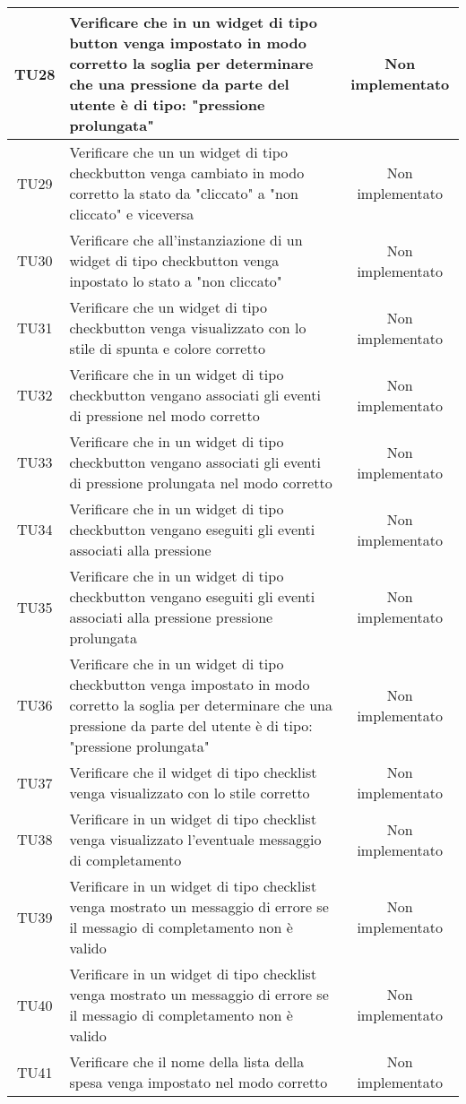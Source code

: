 \begin{center}
\begin{longtable}{|c|>{\centering}m{7cm}|c|}
		TU28 & Verificare che in un widget di tipo button venga impostato in modo corretto la soglia per determinare che una pressione da parte del utente è di tipo: "pressione prolungata" & Non implementato \\ \hline
		TU29 & Verificare che un un widget di tipo checkbutton venga cambiato in modo corretto la stato da "cliccato" a "non cliccato" e viceversa & Non implementato \\ \hline
		TU30 & Verificare che all'instanziazione di un widget di tipo checkbutton venga inpostato lo stato a "non cliccato" & Non implementato \\ \hline
		TU31 & Verificare che un widget di tipo checkbutton venga visualizzato con lo stile di spunta e colore corretto & Non implementato \\ \hline
		TU32 & Verificare che in un widget di tipo checkbutton vengano associati gli eventi di pressione nel modo corretto & Non implementato \\ \hline
		TU33 & Verificare che in un widget di tipo checkbutton vengano associati gli eventi di pressione prolungata nel modo corretto & Non implementato \\ \hline
		TU34 & Verificare che in un widget di tipo checkbutton vengano eseguiti gli eventi associati alla pressione & Non implementato \\ \hline
		TU35 & Verificare che in un widget di tipo checkbutton vengano eseguiti gli eventi associati alla pressione pressione prolungata & Non implementato \\ \hline
		TU36 & Verificare che in un widget di tipo checkbutton venga impostato in modo corretto la soglia per determinare che una pressione da parte del utente è di tipo: "pressione prolungata" & Non implementato \\ \hline
		TU37 & Verificare che il widget di tipo checklist venga visualizzato con lo stile corretto & Non implementato \\ \hline
		TU38 & Verificare in un widget di tipo checklist venga visualizzato l'eventuale messaggio di completamento & Non implementato \\ \hline
		TU39 & Verificare in un widget di tipo checklist venga mostrato un messaggio di errore se il messagio di completamento non è valido & Non implementato \\ \hline
		TU40 & Verificare in un widget di tipo checklist venga mostrato un messaggio di errore se il messagio di completamento non è valido & Non implementato \\ \hline
		TU41 & Verificare che il nome della lista della spesa venga impostato nel modo corretto & Non implementato \\ \hline

\end{longtable}
\end{center}
